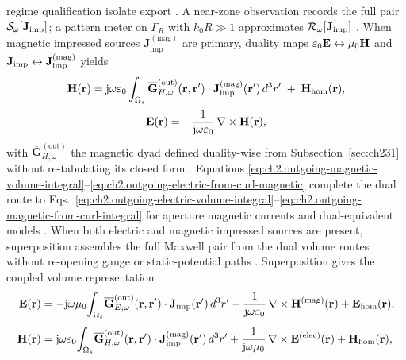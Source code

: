 regime qualification isolate export \cite{stratton1941}. A near-zone observation
records the full pair $\mathcal{S}_\omega[\mathbf{J}_{\mathrm{imp}}]$; a pattern meter on $\Gamma_R$ with
$k_0 R\gg 1$ approximates $\mathcal{R}_\omega[\mathbf{J}_{\mathrm{imp}}]$ \cite{hansen1988}.
When magnetic impressed sources
\(\mathbf{J}^{\mathrm{(mag)}}_{\mathrm{imp}}\) are primary, duality maps
\(\varepsilon_0\mathbf{E}\leftrightarrow\mu_0\mathbf{H}\) and
\(\mathbf{J}_{\mathrm{imp}}\leftrightarrow\mathbf{J}^{\mathrm{(mag)}}_{\mathrm{imp}}\) yields
\begin{equation}
\label{eq:ch2.outgoing-magnetic-volume-integral}
\mathbf{H}(\mathbf{r})
=
\mathrm{j}\omega\varepsilon_0
\int_{\Omega_s}
\overline{\mathbf{G}}_{H,\omega}^{\mathrm{(out)}}(\mathbf{r},\mathbf{r}')\cdot
\mathbf{J}^{\mathrm{(mag)}}_{\mathrm{imp}}(\mathbf{r}')\,d^{3}r'
\;+\;\mathbf{H}_{\mathrm{hom}}(\mathbf{r}),
\end{equation}
\begin{equation}
\label{eq:ch2.outgoing-electric-from-curl-magnetic}
\mathbf{E}(\mathbf{r})
=
-\frac{1}{\mathrm{j}\omega\varepsilon_0}\,\nabla\times\mathbf{H}(\mathbf{r}),
\end{equation}
with \(\overline{\mathbf{G}}_{H,\omega}^{\mathrm{(out)}}\) the magnetic dyad defined
duality-wise from Subsection~\ref{sec:ch231} without re-tabulating its closed form
\cite{stratton1941}. Equations
\eqref{eq:ch2.outgoing-magnetic-volume-integral}--\eqref{eq:ch2.outgoing-electric-from-curl-magnetic}
complete the dual route to Eqs.~\eqref{eq:ch2.outgoing-electric-volume-integral}--\eqref{eq:ch2.outgoing-magnetic-from-curl-integral}
for aperture magnetic currents and dual-equivalent models \cite{stratton1941}.
When both electric and magnetic impressed sources are present, superposition assembles the
full Maxwell pair from the dual volume routes without re-opening gauge or static-potential
paths \cite{stratton1941}. Superposition gives the coupled volume representation
\begin{equation}
\label{eq:ch2.combined-impressed-source-integral}
\begin{aligned}
\mathbf{E}(\mathbf{r})
&=
-\mathrm{j}\omega\mu_0\!\int_{\Omega_s}\!
\overline{\mathbf{G}}_{E,\omega}^{\mathrm{(out)}}(\mathbf{r},\mathbf{r}')\cdot\mathbf{J}_{\mathrm{imp}}(\mathbf{r}')\,d^{3}r'
-\frac{1}{\mathrm{j}\omega\varepsilon_0}\,\nabla\times\mathbf{H}^{(\mathrm{mag})}(\mathbf{r})
+\mathbf{E}_{\mathrm{hom}}(\mathbf{r}),\\[4pt]
\mathbf{H}(\mathbf{r})
&=
\mathrm{j}\omega\varepsilon_0\!\int_{\Omega_s}\!
\overline{\mathbf{G}}_{H,\omega}^{\mathrm{(out)}}(\mathbf{r},\mathbf{r}')\cdot
\mathbf{J}^{\mathrm{(mag)}}_{\mathrm{imp}}(\mathbf{r}')\,d^{3}r'
+\frac{1}{\mathrm{j}\omega\mu_0}\,\nabla\times\mathbf{E}^{(\mathrm{elec})}(\mathbf{r})
+\mathbf{H}_{\mathrm{hom}}(\mathbf{r}),
\end{aligned}
\end{equation}
